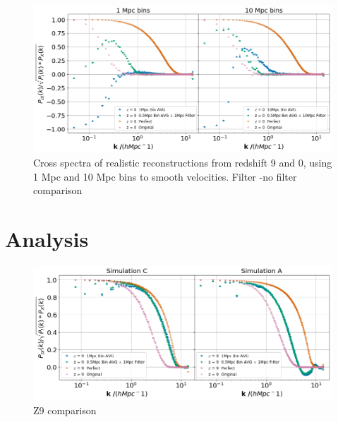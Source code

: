     
    

\begin{figure}
    \centering
    \includegraphics[width=1\columnwidth]{images/realRecon/filterComp.png}%
    
    \caption{
        Cross spectra of realistic reconstructions from redshift 9 and 0, using 1 Mpc and 10 Mpc bins to smooth velocities. Filter -no filter comparison
    }
    
    \label{fig:9}
\end{figure}


\section{Analysis}


\begin{figure}
    \centering
    \includegraphics[width=1\columnwidth]{images/realRecon/z9SimComp.png}%
    
    \caption{
        Z9 comparison
    }
    
    \label{fig:10}
\end{figure}

